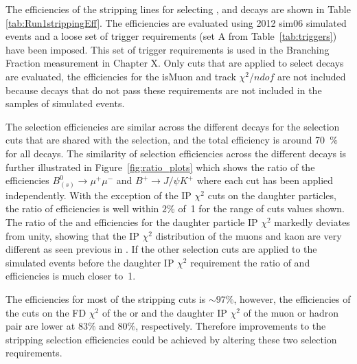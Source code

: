 The efficiencies of the stripping lines for selecting \bmumu, \bhh and \bujpsik decays are shown in Table \ref{tab:Run1strippingEff}. The efficiencies are evaluated using 2012 sim06 simulated events and a loose set of trigger requirements (set A from Table~\ref{tab:triggers}) have been imposed. This set of trigger requirements is used in the Branching Fraction measurement in Chapter X. Only cuts that are applied to select \bmumu decays are evaluated, the efficiencies for the isMuon and track $\chi^{2}$/$ndof$ are not included because decays that do not pass these requirements are not included in the samples of simulated events. 

The selection efficiencies are similar across the different decays for the selection cuts that are shared with the \bmumu selection, and the total efficiency is around 70~$\%$ for all decays. The similarity of selection efficiencies across the different decays is further illustrated in Figure~\ref{fig:ratio_plots} which shows the ratio of the efficiencies $B^{0}_{(s)}\to\mu^{+} \mu^{-}$ and $B^{+}\to J/\psi K^{+}$ where each cut has been applied independently.  With the exception of the IP $\chi^{2}$ cuts on the daughter particles, the ratio of efficiencies is well within $2\%$ of~1 for the range of cuts values shown. The ratio of the \bsmumu and \bujpsik efficiencies for the daughter particle IP $\chi^{2}$ markedly deviates from unity, showing that the IP $\chi^{2}$ distribution of the muons and kaon are very different as seen previous in \cite{Diego}. If the other selection cuts are applied to the simulated events before the daughter IP $\chi^{2}$ requirement the ratio of \bmumu and \bujpsik efficiencies is much closer to~1. 


The efficiencies for most of the stripping cuts is $\sim 97 \%$, however, the efficiencies of the cuts on the FD $\chi^{2}$ of the \bsd or \jpsi and the daughter IP $\chi^{2}$ of the muon or hadron pair are lower at $83 \%$ and $80 \%$, respectively. Therefore improvements to the stripping selection efficiencies could be achieved by altering these two selection requirements. 



